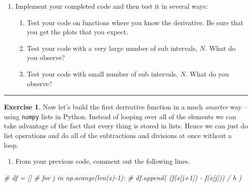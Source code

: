 \documentclass[
]{book}
\newenvironment{Shaded}{\begin{snugshade}}{\end{snugshade}}
\newcommand{\CommentTok}[1]{\textcolor[rgb]{0.56,0.35,0.01}{\textit{#1}}}
\providecommand{\tightlist}{%
  \setlength{\itemsep}{0pt}\setlength{\parskip}{0pt}}
\theoremstyle{definition}
\theoremstyle{definition}
\theoremstyle{definition}
\newtheorem{exercise}{Exercise}[chapter]
\theoremstyle{remark}
\begin{document}
\begin{enumerate}
\def\labelenumi{\alph{enumi}.}
\setcounter{enumi}{3}
\tightlist
\item
  Implement your completed code and then test it in several ways:

  \begin{enumerate}
  \def\labelenumii{\roman{enumii}.}
  \tightlist
  \item
    Test your code on functions where you know the derivative. Be sure that you get the plots that you expect.
  \item
    Test your code with a very large number of sub intervals, \(N\). What do you observe?
  \item
    Test your code with small number of sub intervals, \(N\). What do you observe?
  \end{enumerate}
\end{enumerate}

\begin{center}\rule{0.5\linewidth}{0.5pt}\end{center}

\begin{exercise}
\protect\hypertarget{exr:unnamed-chunk-154}{}{\label{exr:unnamed-chunk-154} }Now let's build the first derivative function in a much \emph{smarter} way -- using \texttt{numpy} lists in Python. Instead of looping over all of the elements we can take advantage of the fact that every thing is stored in lists. Hence we can just do list operations and do all of the subtractions and divisions at once without a loop.
\end{exercise}

\begin{enumerate}
\def\labelenumi{\alph{enumi}.}
\tightlist
\item
  From your previous code, comment out the following lines.
\end{enumerate}

\begin{Shaded}
\begin{Highlighting}[]
\CommentTok{\#     df = []}
\CommentTok{\#     for j in np.arange(len(x){-}1):}
\CommentTok{\#         df.append( (f(x[j+1]) {-} f(x[j])) / h )}
\end{Highlighting}
\end{Shaded}
\end{document}
